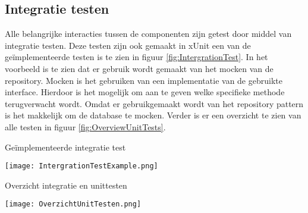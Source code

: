 \subsection{Integratie testen}
Alle belangrijke interacties tussen de componenten zijn getest door middel van integratie testen.
Deze testen zijn ook gemaakt in xUnit een van de geïmplementeerde testen is te zien in figuur \ref{fig:IntergrationTest}.
In het voorbeeld is te zien dat er gebruik wordt gemaakt van het mocken van de repository.
Mocken is het gebruiken van een  implementatie van de gebruikte interface. 
Hierdoor is het mogelijk om aan te geven welke specifieke methode terugverwacht wordt.
Omdat er gebruikgemaakt wordt van het repository pattern is het makkelijk om de database te mocken.
Verder is er een overzicht te zien van alle testen in figuur \ref{fig:OverviewUnitTests}.


\whitespace[2]
\begin{graphic}
	\captionsetup{type=figure}
	\caption{Geïmplementeerde integratie test}
	\texttt{[image: IntergrationTestExample.png]}
	\label{fig:IntergrationTest}
\end{graphic}

\whitespace[2]
\begin{graphic}
	\captionsetup{type=figure}
	\caption{Overzicht integratie en unittesten}
	\texttt{[image: OverzichtUnitTesten.png]}
	\label{fig:OverviewUnitTests}
\end{graphic}
